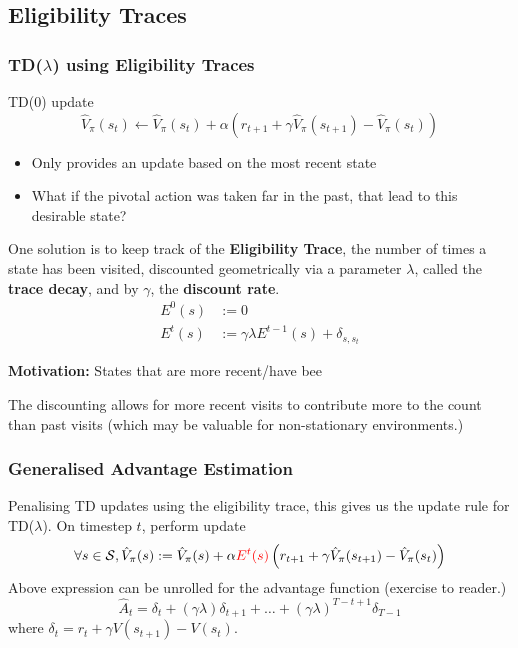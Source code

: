 \documentclass[10pt,a4paper]{beamer}
\newcommand{\red}[1]{\textcolor{red}{#1}}
\begin{document}
\subsection{Eligibility Traces}
\begin{frame}
	\frametitle{TD($\lambda$) using Eligibility Traces}
	
	\begin{block}{TD(0) update}
		$$
		\hat{V}_\pi(s_t)  \leftarrow
		\hat{V}_\pi(s_t) + \alpha \left( r_{t+1} + \gamma \hat{V}_\pi(s_{t+1}) - \hat{V}_\pi(s_t) \right) 
		$$
	\end{block}
	
	\begin{itemize}
		\item Only provides an update based on the most recent state
		\pause
		\item What if the pivotal action was taken far in the past,
		that lead to this desirable state?
		\pause
	\end{itemize}
	
	One solution is to keep track of the \textbf{Eligibility Trace}, the number of times a state has been visited, discounted
	geometrically via a parameter $\lambda$, called the \textbf{trace decay}, and by $\gamma$, the \textbf{discount rate}.
	\begin{align*}
		E^0(s) &:= 0 \\
		E^t(s) &:= \gamma \lambda E^{t-1}(s) + \delta_{s, s_t}
	\end{align*}
	
	\pause
	
			\textbf{Motivation:} States that are more recent/have bee
			
	The discounting allows for more recent visits to contribute more to the count than past visits (which may be valuable for
	non-stationary environments.)
	\pause
	
\end{frame}

\begin{frame}
	\frametitle{Generalised Advantage Estimation}
	
	Penalising TD updates using the eligibility trace, this gives us the update rule for TD($\lambda$). On timestep $t$, perform update
	\begin{align*}
		\forall s \in \mathcal{S}, \hat{V}_\pi(s) & := \hat{V}_\pi(s) + \alpha \red{E^t(s)}  \left( r_{t+1} + \gamma \hat{V}_\pi(s_{t+1}) - \hat{V}_\pi(s_t) \right)  \\
	\end{align*}
	Above expression can be unrolled for the advantage function (exercise to reader.) 
	$$
	\hat{A}_t = \delta_t +(\gamma \lambda)\delta_{t+1} + \ldots + 
	(\gamma \lambda)^{T-t+1} \delta_{T-1}
	$$
	where
	$\delta_t = r_t + \gamma V(s_{t+1}) - V(s_t)$.
\end{frame}
\end{document}

